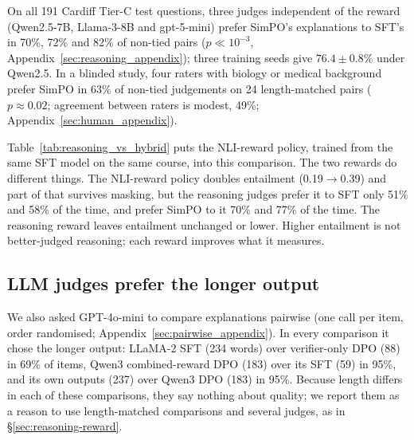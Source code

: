 

On all 191 Cardiff Tier-C test questions, three judges independent of the reward (Qwen2.5-7B, Llama-3-8B and gpt-5-mini) prefer SimPO's explanations to SFT's in 70\%, 72\% and 82\% of non-tied pairs ($p\ll10^{-3}$, Appendix~\ref{sec:reasoning_appendix}); three training seeds give $76.4\pm0.8\%$ under Qwen2.5. In a blinded study, four raters with biology or medical background prefer SimPO in 63\% of non-tied judgements on 24 length-matched pairs ($p\approx0.02$; agreement between raters is modest, 49\%; Appendix~\ref{sec:human_appendix}).

Table~\ref{tab:reasoning_vs_hybrid} puts the NLI-reward policy, trained from the same SFT model on the same course, into this comparison. The two rewards do different things. The NLI-reward policy doubles entailment (0.19$\to$0.39) and part of that survives masking, but the reasoning judges prefer it to SFT only 51\% and 58\% of the time, and prefer SimPO to it 70\% and 77\% of the time. The reasoning reward leaves entailment unchanged or lower. Higher entailment is not better-judged reasoning; each reward improves what it measures.

\subsection{LLM judges prefer the longer output}
\label{sec:verbosity}
We also asked GPT-4o-mini to compare explanations pairwise (one call per item, order randomised; Appendix~\ref{sec:pairwise_appendix}). In every comparison it chose the longer output: LLaMA-2 SFT (234 words) over verifier-only DPO (88) in 69\% of items, Qwen3 combined-reward DPO (183) over its SFT (59) in 95\%, and its own outputs (237) over Qwen3 DPO (183) in 95\%. Because length differs in each of these comparisons, they say nothing about quality; we report them as a reason to use length-matched comparisons and several judges, as in \S\ref{sec:reasoning-reward}.
